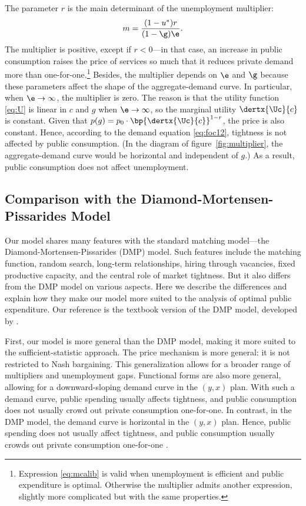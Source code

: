 \documentclass[letterpaper,12pt,leqno]{article}
\begin{document}
\begin{bibunit}
The parameter $r$ is the main determinant of the unemployment multiplier:
\begin{equation}
m=\frac{(1-u^*) r}{(1-\g)\e}.
\label{eq:mcalib}\end{equation}
The multiplier is positive, except if $r<0$---in that case, an increase in public consumption raises the price of services so much that it reduces private demand more than one-for-one.\footnote{Expression \eqref{eq:mcalib} is valid when unemployment is efficient and public expenditure is optimal. Otherwise the multiplier admits another expression, slightly more complicated but with the same properties.} Besides, the multiplier depends on $\e$ and $\g$ because these parameters affect the shape of the aggregate-demand curve. In particular, when $\e \to \infty$, the multiplier is zero. The reason is that the utility function \eqref{eq:U} is linear in $c$ and $g$ when $\e \to \infty$, so the marginal utility $\dertx{\Uc}{c}$ is constant. Given that $p(g)= p_{0} \cdot \bp{\dertx{\Uc}{c}}^{1-r}$, the price is also constant. Hence, according to the demand equation \eqref{eq:foc12}, tightness is not affected by public consumption. (In the diagram of figure~\ref{fig:multiplier}, the aggregate-demand curve would be horizontal and independent of $g$.) As a result, public consumption does not affect unemployment.


\subsection{Comparison with the Diamond-Mortensen-Pissarides Model}

Our model shares many features with the standard matching model---the Diamond-Mortensen-Pissarides (DMP) model. Such features include the matching function, random search, long-term relationships, hiring through vacancies, fixed productive capacity, and the central role of market tightness. But it also differs from the DMP model on various aspects. Here we describe the differences and explain how they make our model more suited to the analysis of optimal public expenditure. Our reference is the textbook version of the DMP model, developed by .

First, our model is more general than the DMP model, making it more suited to the sufficient-statistic approach. The price mechanism is more general: it is not restricted to Nash bargaining. This generalization allows for a broader range of multipliers and unemployment gaps. Functional forms are also more general, allowing for a downward-sloping demand curve in the $(y,x)$ plan. With such a demand curve, public spending usually affects tightness, and public consumption does not usually crowd out private consumption one-for-one. In contrast, in the DMP model, the demand curve is horizontal in the $(y,x)$ plan. Hence, public spending does not usually affect tightness, and public consumption usually crowds out private consumption one-for-one .


\end{bibunit}
\end{document}
